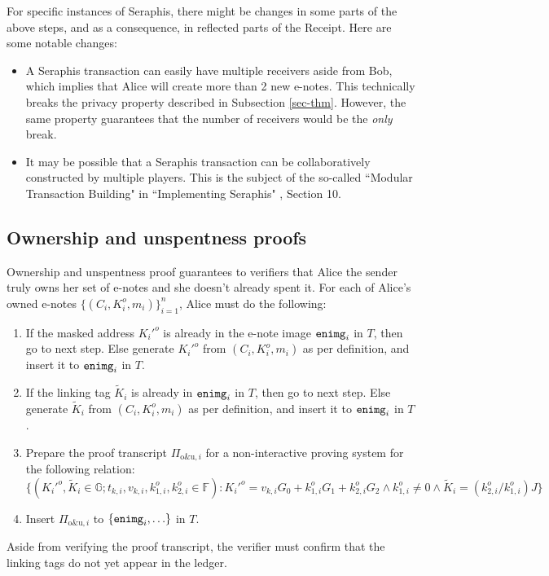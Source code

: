 \documentclass{article}
\theoremstyle{plain}
\theoremstyle{remark}
\begin{document}
For specific instances of Seraphis, there might be changes in some parts of the above steps, and as a consequence, in reflected parts of the Receipt. Here are some notable changes:
\begin{itemize}
\item A Seraphis transaction can easily have multiple receivers aside from Bob, which implies that Alice will create more than 2 new e-notes. This technically breaks the privacy property described in Subsection \ref{sec-thm}. However, the same property guarantees that the number of receivers would be the \textit{only} break.
\item It may be possible that a Seraphis transaction can be collaboratively constructed by multiple players. This is the subject of the so-called ``Modular Transaction Building" in ``Implementing Seraphis" \cite{seraphis}, Section 10.
\end{itemize}

\subsection{Ownership and unspentness proofs}\label{own-unsp}
Ownership and unspentness proof guarantees to verifiers that Alice the sender truly owns her set of e-notes and she doesn't already spent it. For each of Alice's owned e-notes $\{(C_i,K_i^o,m_i)\}_{i=1}^n$, Alice must do the following:
\begin{enumerate}
    \item If the masked address $K_i'^o$ is already in the e-note image ${\tt enimg}_i$ in $T$, then go to next step. Else generate $K_i'^o$ from $(C_i, K_i^o, m_i)$ as per definition, and insert it to ${\tt enimg}_i$ in $T$.
    \item If the linking tag $\tilde{K}_i$ is already in ${\tt enimg}_i$ in $T$, then go to next step. Else generate $\tilde{K}_i$ from $(C_i, K_i^o, m_i)$ as per definition, and insert it to ${\tt enimg}_i$ in $T$.
    \item Prepare the proof transcript $\Pi_{\text{o\&u}, i}$ for a non-interactive proving system for the following relation:
$$\{(K_i'^o, \tilde{K}_i\in\mathbb{G}; t_{k,i}, v_{k,i}, k_{1,i}^o, k_{2,i}^o\in\mathbb{F}): K_i'^o = v_{k,i} G_0 + k_{1,i}^o G_1 + k_{2,i}^o G_2 \wedge k_{1,i}^o \ne 0 \wedge \tilde{K}_i = (k_{2,i}^o/k_{1,i}^o)J \}$$
    \item Insert $\Pi_{\text{o\&u}, i}$ to $\{{\tt enimg}_i, \ldots\}$ in $T$.
\end{enumerate}
Aside from verifying the proof transcript, the verifier must confirm that the linking tags do not yet appear in the ledger.
\end{document}
